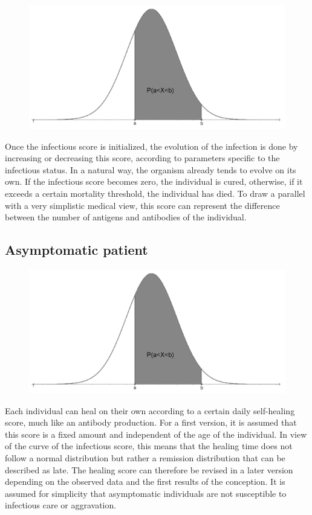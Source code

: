 \begin{figure}[h]
  \centering
  \includegraphics[width=0.5\linewidth]{media/loi_gauss.png}
  \caption{}
  \label{fig:loigauss}
\end{figure}

\bigskip

Once the infectious score is initialized, the evolution of the infection is done by increasing or decreasing this score, according to parameters specific to the infectious status. In a natural way, the organism already tends to evolve on its own. If the infectious score becomes zero, the individual is cured, otherwise, if it exceeds a certain mortality threshold, the individual has died. To draw a parallel with a very simplistic medical view, this score can represent the difference between the number of antigens and antibodies of the individual.\\

\subsection{Asymptomatic patient}

\begin{figure}
  \centering
  \includegraphics[trim = 0 0 334 0, clip, width=\linewidth]{media/loi_gauss.png}
\end{figure}

Each individual can heal on their own according to a certain daily self-healing score, much like an antibody production. For a first version, it is assumed that this score is a fixed amount and independent of the age of the individual. In view of the curve of the infectious score, this means that the healing time does not follow a normal distribution but rather a remission distribution that can be described as late. The healing score can therefore be revised in a later version depending on the observed data and the first results of the conception. It is assumed for simplicity that asymptomatic individuals are not susceptible to infectious care or aggravation.\\


